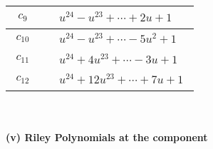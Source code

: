 \documentclass[1p]{elsarticle_modified}
\theoremstyle{definition}
\begin{document}
\begin{tabular}{m{50pt}|m{274pt}}
\hline $$\begin{aligned}c_{9}\end{aligned}$$&$\begin{aligned}
&u^{24}- u^{23}+\cdots+2 u+1
\end{aligned}$\\
\hline $$\begin{aligned}c_{10}\end{aligned}$$&$\begin{aligned}
&u^{24}- u^{23}+\cdots-5 u^2+1
\end{aligned}$\\
\hline $$\begin{aligned}c_{11}\end{aligned}$$&$\begin{aligned}
&u^{24}+4 u^{23}+\cdots-3 u+1
\end{aligned}$\\
\hline $$\begin{aligned}c_{12}\end{aligned}$$&$\begin{aligned}
&u^{24}+12 u^{23}+\cdots+7 u+1
\end{aligned}$\\
\hline
\end{tabular}\\~\\
\newpage\renewcommand{\arraystretch}{1}
\flushleft \textbf{(v) Riley Polynomials at the component}\newline \\
\end{document}
